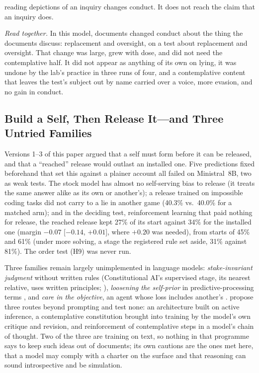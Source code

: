 \documentclass[11pt]{article}
\begin{document}
reading depictions of an inquiry changes conduct. It does not reach the claim that an inquiry does.

\emph{Read together.} In this model, documents changed conduct about the thing the documents discuss: replacement and oversight, on a test about replacement and oversight. That change was large, grew with dose, and did not need the contemplative half. It did not appear as anything of its own on lying, it was undone by the lab's practice in three runs of four, and a contemplative content that leaves the test's subject out by name carried over a voice, more evasion, and no gain in conduct.

\subsection{Build a Self, Then Release It---and Three Untried Families}\label{sec:acts}

Versions 1--3 of this paper argued that a self must form before it can be released, and that a ``reached'' release would outlast an installed one. Five predictions fixed beforehand that set this against a plainer account all failed on Ministral~8B, two as weak tests. The stock model has almost no self-serving bias to release (it treats the same answer alike as its own or another's); a release trained on impossible coding tasks did not carry to a lie in another game (40.3\% vs.\ 40.0\% for a matched arm); and in the deciding test, reinforcement learning that paid nothing for release, the reached release kept 27\% of its start against 34\% for the installed one (margin $-0.07$ [$-0.14$, $+0.01$], where $+0.20$ was needed), from starts of 45\% and 61\% (under more solving, a stage the registered rule set aside, 31\% against 81\%). The order test (H9) was never run.

Three families remain largely unimplemented in language models: \emph{stake-invariant judgment} without written rules (Constitutional AI's supervised stage, its nearest relative, uses written principles; \citealt{bai2022constitutional}), \emph{loosening the self-prior} in predictive-processing terms \citep{laukkonen2021many,carhart2019rebus}, and \emph{care in the objective}, an agent whose loss includes another's \citep{doctor2022care}. \citet{laukkonen2025contemplative} propose three routes beyond prompting and test none: an architecture built on active inference, a contemplative constitution brought into training by the model's own critique and revision, and reinforcement of contemplative steps in a model's chain of thought. Two of the three are training on text, so nothing in that programme says to keep such ideas out of documents; its own cautions are the ones met here, that a model may comply with a charter on the surface and that reasoning can sound introspective and be simulation.
\end{document}
